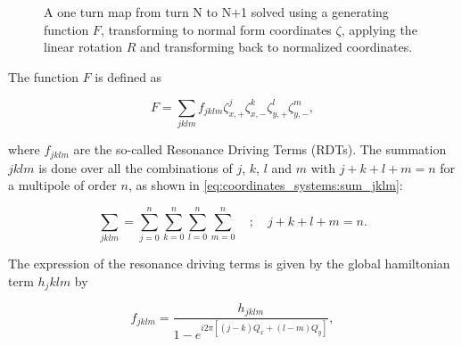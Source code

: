 \begin{figure}[H]
    \centering
    \caption{A one turn map from turn N to N+1 solved using a generating function $F$, 
    transforming to normal form coordinates $\zeta$, applying the linear rotation $R$ and
    transforming back to normalized coordinates.}
    \label{fig:coordinate_systems:non_linear_map_normal_form}
\end{figure}

The function $F$ is defined as

\begin{equation}
    F = \sum_{jklm} f_{jklm}\zeta_{x,+}^j \zeta_{x,-}^k \zeta_{y,+}^l \zeta_{y,-}^m,
\end{equation}

where $f_{jklm}$ are the so-called Resonance Driving Terms (RDTs).  The summation $jklm$ is done
over all the combinations of $j$, $k$, $l$ and $m$ with $j+k+l+m = n$ for a multipole of order $n$,
as shown in \cref{eq:coordinates_systems:sum_jklm}:

\begin{equation}
    \sum_{jklm} = \sum_{j=0}^n \sum_{k=0}^n \sum_{l=0}^n \sum_{m=0}^n \quad;\quad j+k+l+m=n.
    \label{eq:coordinates_systems:sum_jklm}
\end{equation}

The expression of the resonance driving terms is given by the global hamiltonian term $h_jklm$ by

\begin{equation}
    f_{jklm} = \frac{h_{jklm}}{1 - e^{i2\pi \left[ (j-k)Q_x + (l-m) Q_y \right]}},
    \label{eq:coordinate_systems:fjklm}
\end{equation}


